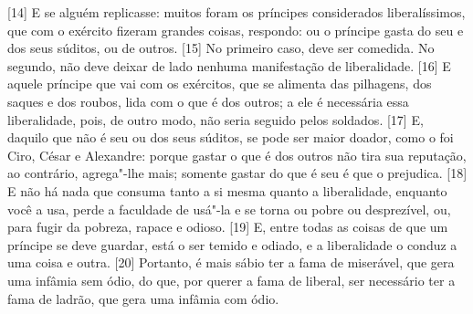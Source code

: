 {[}14{]} E se alguém replicasse: muitos foram os príncipes considerados
liberalíssimos, que com o exército fizeram grandes coisas, respondo: ou
o príncipe gasta do seu e dos seus súditos, ou de outros. {[}15{]} No
primeiro caso, deve ser comedida. No segundo, não deve deixar de lado
nenhuma manifestação de liberalidade. {[}16{]} E aquele príncipe que vai
com os exércitos, que se alimenta das pilhagens, dos saques e dos
roubos, lida com o que é dos outros; a ele é necessária essa
liberalidade, pois, de outro modo, não seria seguido pelos soldados.
{[}17{]} E, daquilo que não é seu ou dos seus súditos, se pode ser maior
doador, como o foi Ciro, César e Alexandre: porque gastar o que é dos
outros não tira sua reputação, ao contrário, agrega"-lhe mais; somente
gastar do que é seu é que o prejudica. {[}18{]} E não há nada que
consuma tanto a si mesma quanto a liberalidade, enquanto você a usa,
perde a faculdade de usá"-la e se torna ou pobre ou desprezível, ou, para
fugir da pobreza, rapace e odioso. {[}19{]} E, entre todas as coisas de
que um príncipe se deve guardar, está o ser temido e odiado, e a
liberalidade o conduz a uma coisa e outra. {[}20{]} Portanto, é mais
sábio ter a fama de miserável, que gera uma infâmia sem ódio, do que,
por querer a fama de liberal, ser necessário ter a fama de ladrão, que
gera uma infâmia com ódio.



